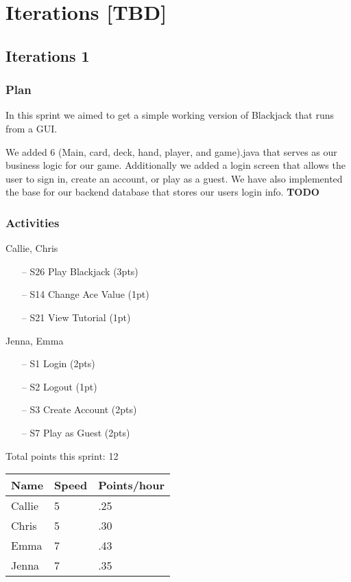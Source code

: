 \section{Iterations \textbf{[TBD]}} 
\subsection{Iterations 1}
\subsubsection{Plan}
In this sprint we aimed to get a simple working version of Blackjack that runs from a GUI.

We added 6 (Main, card, deck, hand, player, and game).java that serves as our business logic for our game. Additionally we added a login screen that allows the user to sign in, create an account, or play as a guest. We have also implemented the base for our backend database that stores our users login info. \textbf{TODO}

\subsubsection{Activities}
Callie, Chris 
\begin{itemize}
    \item [--] S26 Play Blackjack (3pts) 
    \item [--] S14 Change Ace Value (1pt)
    \item [--] S21 View Tutorial (1pt)
\end{itemize} 
Jenna, Emma
\begin{itemize}
    \item [--] S1 Login (2pts) 
    \item [--] S2 Logout (1pt)
    \item [--] S3 Create Account (2pts)
    \item [--] S7 Play as Guest (2pts)
\end{itemize} 

Total points this sprint: 12

\begin{table}[!hbt]
\begin{tabular}{lll}
\hline
\multicolumn{1}{|c|}{\textbf{Name}} & \multicolumn{1}{c|}{\textbf{Speed}} & \multicolumn{1}{c|}{\textbf{Points/hour}} \\ \hline
Callie                              & 5                                   & .25                                          \\
Chris                               & 5                                   & .30                                         \\
Emma                                & 7                                   & .43                                          \\
Jenna                               & 7                                   & .35                                        
\end{tabular}
\end{table}

